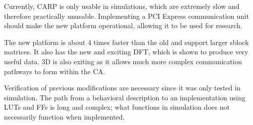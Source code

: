Currently, CARP is only usable in simulations, which are extremely slow and therefore practically unusable.
Implementing a PCI Express communication unit should make the new platform operational, allowing it to be used for research.

The new platform is about 4 times faster than the old and support larger sblock matrices.
It also has the new and exciting DFT, which is shown to produce very useful data.
3D is also exiting as it allows much more complex communication pathways to form within the CA.

Verification of previous modifications are necessary since it was only tested in simulation.
The path from a behavioral description to an implementation using LUTs and FFs is long and complex; what functions in simulation does not necessarily function when implemented.

